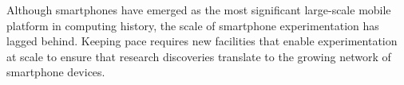 Although smartphones have emerged as the most significant large-scale mobile
platform in computing history, the scale of smartphone experimentation has
lagged behind. Keeping pace requires new facilities that enable
experimentation at scale to ensure that research discoveries translate to the
growing network of smartphone devices.





